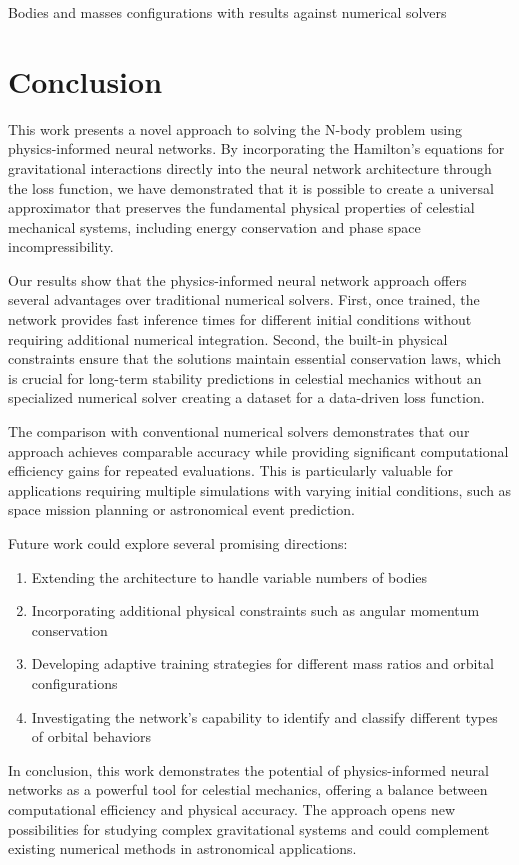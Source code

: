 \documentclass[draft]{agujournal2019}
\begin{document}
Bodies and masses configurations with results against numerical solvers

\section{Conclusion}
This work presents a novel approach to solving the N-body problem using physics-informed neural networks. By incorporating the Hamilton's equations for gravitational interactions directly into the neural network architecture through the loss function, we have demonstrated that it is possible to create a universal approximator that preserves the fundamental physical properties of celestial mechanical systems, including energy conservation and phase space incompressibility.

Our results show that the physics-informed neural network approach offers several advantages over traditional numerical solvers. First, once trained, the network provides fast inference times for different initial conditions without requiring additional numerical integration. Second, the built-in physical constraints ensure that the solutions maintain essential conservation laws, which is crucial for long-term stability predictions in celestial mechanics without an specialized numerical solver creating a dataset for a data-driven loss function.

The comparison with conventional numerical solvers demonstrates that our approach achieves comparable accuracy while providing significant computational efficiency gains for repeated evaluations. This is particularly valuable for applications requiring multiple simulations with varying initial conditions, such as space mission planning or astronomical event prediction.

Future work could explore several promising directions:
\begin{enumerate}
    \item Extending the architecture to handle variable numbers of bodies
    \item Incorporating additional physical constraints such as angular momentum conservation
    \item Developing adaptive training strategies for different mass ratios and orbital configurations
    \item Investigating the network's capability to identify and classify different types of orbital behaviors
\end{enumerate}

In conclusion, this work demonstrates the potential of physics-informed neural networks as a powerful tool for celestial mechanics, offering a balance between computational efficiency and physical accuracy. The approach opens new possibilities for studying complex gravitational systems and could complement existing numerical methods in astronomical applications.
\end{document}
